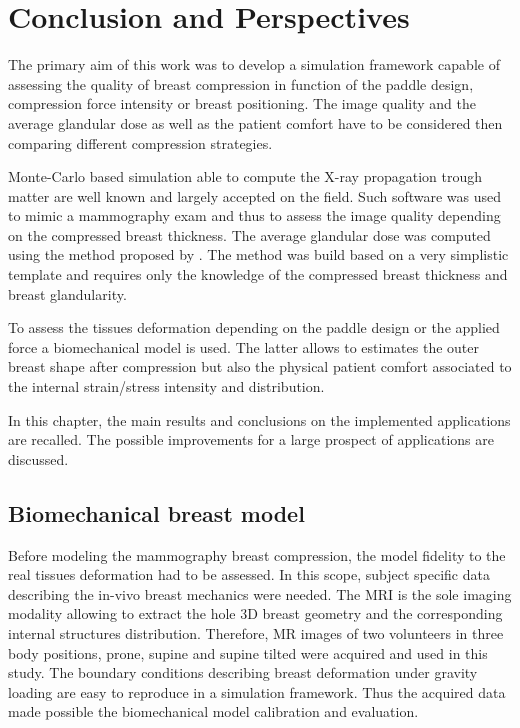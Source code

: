 
\chapter{Conclusion and Perspectives}\label{section:generalconclusion}


The primary aim of this work was to develop a simulation framework capable of assessing the quality of breast compression in function of the paddle design, compression force intensity or breast positioning. The image quality and the average glandular dose as well as the patient comfort have to be considered then comparing different compression strategies.

 Monte-Carlo based simulation able to compute the X-ray propagation trough matter are well known and largely accepted on the field. Such software was used to mimic a mammography exam and thus to assess the image quality depending on the compressed breast thickness. The average glandular dose was computed using the method proposed by \citep{dance_additional_2000}. The method was build based on a very simplistic template and requires only the knowledge of the compressed breast thickness and breast glandularity. 
 
 To assess the tissues deformation depending on the paddle design or the applied force a biomechanical model is used. The latter allows to estimates the outer breast shape after compression but also the physical patient comfort associated to the internal strain/stress intensity and distribution.
 
 In this chapter, the main results and conclusions on the implemented applications are recalled. The possible improvements for a large prospect of applications are discussed. 
 \clearpage
 \section{Biomechanical breast model }
  Before modeling the mammography breast compression, the model fidelity to the real tissues deformation had to be assessed. In this  scope, subject specific data describing the in-vivo breast mechanics were needed. The MRI is the sole imaging modality allowing to extract the hole 3D breast geometry and the corresponding internal structures distribution.  Therefore, MR images of two volunteers in three body positions, prone, supine and supine tilted were acquired and used in this study. The boundary conditions describing breast deformation under gravity loading are easy to reproduce in a simulation framework. Thus the acquired data made possible the biomechanical model calibration and evaluation.
  
